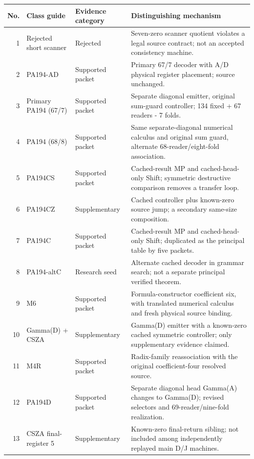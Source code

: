 {\footnotesize
\begin{longtable}{@{}r >{\raggedright\arraybackslash}p{.21\linewidth}
 >{\raggedright\arraybackslash}p{.14\linewidth}
 >{\raggedright\arraybackslash}p{.54\linewidth}@{}}
\toprule No. & Class guide & Evidence category & Distinguishing mechanism\\\midrule\endhead
1 & Rejected short scanner & Rejected & Seven-zero scanner quotient violates a legal source contract; not an accepted consistency machine.\\[4pt]
2 & PA194-AD & Supported packet & Primary 67/7 decoder with A/D physical register placement; source unchanged.\\[4pt]
3 & Primary PA194 (67/7) & Supported packet & Separate diagonal emitter, original sum-guard controller; 134 fixed + 67 readers - 7 folds.\\[4pt]
4 & PA194 (68/8) & Supported packet & Same separate-diagonal numerical calculus and original sum guard, alternate 68-reader/eight-fold association.\\[4pt]
5 & PA194CS & Supported packet & Cached-result MP and cached-head-only Shift; symmetric destructive comparison removes a transfer loop.\\[4pt]
6 & PA194CZ & Supplementary & Cached controller plus known-zero source jump; a secondary same-size composition.\\[4pt]
7 & PA194C & Supported packet & Cached-result MP and cached-head-only Shift; duplicated as the principal table by five packets.\\[4pt]
8 & PA194-altC & Research seed & Alternate cached decoder in grammar search; not a separate principal verified theorem.\\[4pt]
9 & M6 & Supported packet & Formula-constructor coefficient six, with translated numerical calculus and fresh physical source binding.\\[4pt]
10 & Gamma(D) + CSZA & Supplementary & Gamma(D) emitter with a known-zero cached symmetric controller; only supplementary evidence claimed.\\[4pt]
11 & M4R & Supported packet & Radix-family reassociation with the original coefficient-four resolved source.\\[4pt]
12 & PA194D & Supported packet & Separate diagonal head Gamma(A) changes to Gamma(D); revised selectors and 69-reader/nine-fold realization.\\[4pt]
13 & CSZA final-register 5 & Supplementary & Known-zero final-return sibling; not included among independently replayed main D/J machines.\\[4pt]

\end{longtable}}

